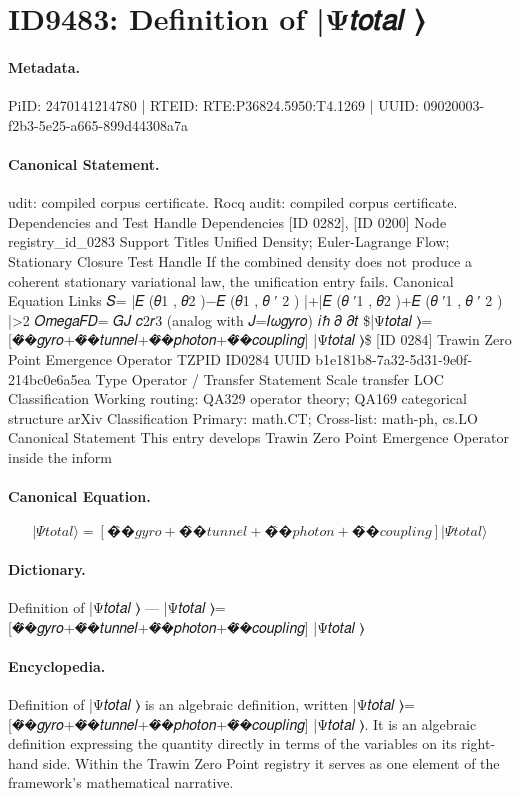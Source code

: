 \section*{ID9483: Definition of |Ψ𝑡𝑜𝑡𝑎𝑙 ⟩}
\paragraph{Metadata.}
PiID: 2470141214780 | RTEID: RTE:P36824.5950:T4.1269 | UUID: 09020003-f2b3-5e25-a665-899d44308a7a

\paragraph{Canonical Statement.}
udit: compiled corpus certificate. Rocq audit: compiled corpus certificate. Dependencies and Test Handle Dependencies [ID 0282], [ID 0200] Node registry\_id\_0283 Support Titles Unified Density; Euler-Lagrange Flow; Stationary Closure Test Handle If the combined density does not produce a coherent stationary variational law, the unification entry fails. Canonical Equation Links 𝑆= |𝐸 (𝜃1 , 𝜃2 )−𝐸 (𝜃1 , 𝜃 ′ 2 ) |+|𝐸 (𝜃 ′1 , 𝜃2 )+𝐸 (𝜃 ′1 , 𝜃 ′ 2 ) |>2 𝑂𝑚𝑒𝑔𝑎𝐹𝐷= 𝐺𝐽 𝑐2𝑟3 (analog with 𝐽=𝐼𝜔𝑔𝑦𝑟𝑜) 𝑖ℏ 𝜕 𝜕𝑡 \$|Ψ𝑡𝑜𝑡𝑎𝑙 ⟩=[�̂�𝑔𝑦𝑟𝑜+�̂�𝑡𝑢𝑛𝑛𝑒𝑙+�̂�𝑝ℎ𝑜𝑡𝑜𝑛+�̂�𝑐𝑜𝑢𝑝𝑙𝑖𝑛𝑔] |Ψ𝑡𝑜𝑡𝑎𝑙 ⟩\$ [ID 0284] Trawin Zero Point Emergence Operator TZPID ID0284 UUID b1e181b8-7a32-5d31-9e0f-214bc0e6a5ea Type Operator / Transfer Statement Scale transfer LOC Classification Working routing: QA329 operator theory; QA169 categorical structure arXiv Classification Primary: math.CT; Cross-list: math-ph, cs.LO Canonical Statement This entry develops Trawin Zero Point Emergence Operator inside the inform

\paragraph{Canonical Equation.}
\[
|Ψ𝑡𝑜𝑡𝑎𝑙 ⟩=[�̂�𝑔𝑦𝑟𝑜+�̂�𝑡𝑢𝑛𝑛𝑒𝑙+�̂�𝑝ℎ𝑜𝑡𝑜𝑛+�̂�𝑐𝑜𝑢𝑝𝑙𝑖𝑛𝑔] |Ψ𝑡𝑜𝑡𝑎𝑙 ⟩
\]

\paragraph{Dictionary.}
Definition of |Ψ𝑡𝑜𝑡𝑎𝑙 ⟩ — |Ψ𝑡𝑜𝑡𝑎𝑙 ⟩=[�̂�𝑔𝑦𝑟𝑜+�̂�𝑡𝑢𝑛𝑛𝑒𝑙+�̂�𝑝ℎ𝑜𝑡𝑜𝑛+�̂�𝑐𝑜𝑢𝑝𝑙𝑖𝑛𝑔] |Ψ𝑡𝑜𝑡𝑎𝑙 ⟩

\paragraph{Encyclopedia.}
Definition of |Ψ𝑡𝑜𝑡𝑎𝑙 ⟩ is an algebraic definition, written |Ψ𝑡𝑜𝑡𝑎𝑙 ⟩=[�̂�𝑔𝑦𝑟𝑜+�̂�𝑡𝑢𝑛𝑛𝑒𝑙+�̂�𝑝ℎ𝑜𝑡𝑜𝑛+�̂�𝑐𝑜𝑢𝑝𝑙𝑖𝑛𝑔] |Ψ𝑡𝑜𝑡𝑎𝑙 ⟩. It is an algebraic definition expressing the quantity directly in terms of the variables on its right-hand side. Within the Trawin Zero Point registry it serves as one element of the framework's mathematical narrative.
